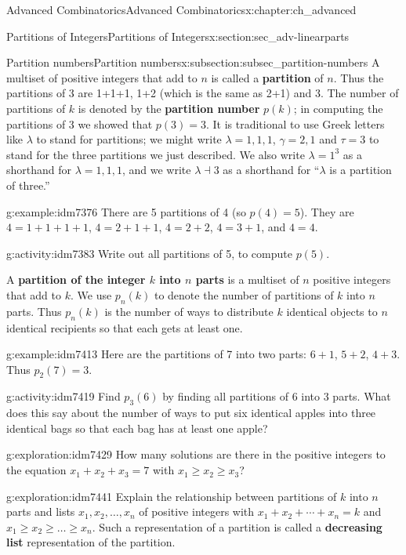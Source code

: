 \documentclass[oneside,10pt,]{book}
\newcommand{\terminology}[1]{\textbf{#1}}
\numberwithin{equation}{chapter}
\begin{document}
\begin{chapterptx}{Advanced Combinatorics}{}{Advanced Combinatorics}{}{}{x:chapter:ch_advanced}
\begin{sectionptx}{Partitions of Integers}{}{Partitions of Integers}{}{}{x:section:sec_adv-linearparts}
\begin{subsectionptx}{Partition numbers}{}{Partition numbers}{}{}{x:subsection:subsec_partition-numbers}
A multiset of positive integers that add to \(n\) is called a \terminology{partition} of \(n\). Thus the partitions of 3 are 1+1+1, 1+2 (which is the same as 2+1) and 3. The number of partitions of \(k\) is denoted by the \terminology{partition number} \(p(k)\); in computing the partitions of 3 we showed that \(p(3) = 3\). It is traditional to use Greek letters like \(\lambda\) to stand for partitions; we might write \(\lambda = 1,1,1\), \(\gamma= 2,1\) and \(\tau = 3\) to stand for the three partitions we just described. We also write \(\lambda = 1^3\) as a shorthand for \(\lambda = 1,1,1\), and we write \(\lambda \dashv 3\) as a shorthand for ``\(\lambda\) is a partition of three.''%
\begin{example}{}{g:example:idm7376}%
There are 5 partitions of 4 (so \(p(4) = 5\)).  They are \(4=1+1+1+1\), \(4=2+1+1\), \(4=2+2\), \(4=3+1\), and \(4=4\).\end{example}
\begin{activity}{}{g:activity:idm7383}%
Write out all partitions of 5, to compute \(p(5)\).%
\end{activity}
A \terminology{partition of the integer \(k\) into \(n\) parts} is a multiset of \(n\) positive integers that add to \(k\). We use \(p_n(k)\) to denote the number of partitions of \(k\) into \(n\) parts. Thus \(p_n(k)\) is the number of ways to distribute \(k\) identical objects to \(n\) identical recipients so that each gets at least one.%
\begin{example}{}{g:example:idm7413}%
Here are the partitions of 7 into two parts: \(6+1\), \(5+2\), \(4+3\).  Thus \(p_2(7) = 3\).%
\end{example}
\begin{activity}{}{g:activity:idm7419}%
Find \(p_3(6)\) by finding all partitions of 6 into 3 parts. What does this say about the number of ways to put six identical apples into three identical bags so that each bag has at least one apple?%
\end{activity}
\begin{exploration}{}{g:exploration:idm7429}%
How many solutions are there in the positive integers to the equation \(x_1+x_2+x_3 =7\) with \(x_1\ge x_2\ge x_3\)?%
\end{exploration}
\begin{exploration}{}{g:exploration:idm7441}%
Explain the relationship between partitions of \(k\) into \(n\) parts and lists \(x_1,x_2,\ldots,x_n\) of positive integers with \(x_1 + x_2 + \cdots + x_n = k\) and \(x_1\ge x_2\ge\ldots \ge x_n\). Such a representation of a partition is called a \terminology{decreasing list} representation of the partition.%

\end{exploration}
\end{subsectionptx}
\end{sectionptx}
\end{chapterptx}
\end{document}
